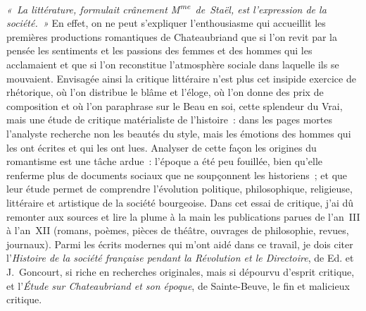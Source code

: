 \documentclass[french,twoside]{book} %
\begin{document}
\emph{« La littérature, formulait crânement M\textsuperscript{me} de Staël, est l’expression de la société. »} En effet, on ne peut s’expliquer l’enthousiasme qui accueillit les premières productions romantiques de Chateaubriand que si l’on revit par la pensée les sentiments et les passions des femmes et des hommes qui les acclamaient et que si l’on reconstitue l’atmosphère sociale dans laquelle ils se mouvaient. Envisagée ainsi la critique littéraire n’est plus cet insipide exercice de rhétorique, où l’on distribue le blâme et l’éloge, où l’on donne des prix de composition et où l’on paraphrase sur le Beau en soi, cette splendeur du Vrai, mais une étude de critique matérialiste de l’histoire : dans les pages mortes l’analyste recherche non les beautés du style, mais les émotions des hommes qui les ont écrites et qui les ont lues. Analyser de cette façon les origines du romantisme est une tâche ardue : l’époque a été peu fouillée, bien qu’elle renferme plus de documents sociaux que ne soupçonnent les historiens ; et que leur étude permet de comprendre l’évolution politique, philosophique, religieuse, littéraire et artistique de la société bourgeoise. Dans cet essai de critique, j’ai dû remonter aux sources et lire la plume à la main les publications parues de l’an III à l’an XII (romans, poèmes, pièces de théâtre, ouvrages de philosophie, revues, journaux). Parmi les écrits modernes qui m’ont aidé dans ce travail, je dois citer l’\emph{Histoire de la société française pendant la Révolution et le Directoire}, de Ed. et J. Goncourt, si riche en recherches originales, mais si dépourvu d’esprit critique, et l’\emph{Étude sur Chateaubriand et son époque}, de Sainte-Beuve, le fin et malicieux critique.
\end{document}
